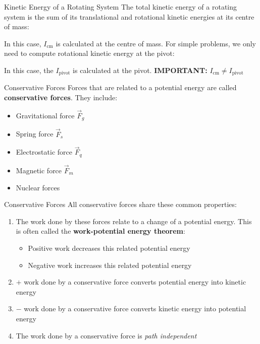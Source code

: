 \documentclass[12pt,compress,aspectratio=169]{beamer}
\begin{document}
\begin{frame}{Kinetic Energy of a Rotating System}
  The total kinetic energy of a rotating system is the sum of its translational
  and rotational kinetic energies at its centre of mass:

  
  In this case, $I_\text{cm}$ is calculated at the centre of mass. For simple
  problems, we only need to compute rotational kinetic energy at the pivot:
  
  
  In this case, the $I_\text{pivot}$ is calculated at the pivot.
  \textbf{IMPORTANT:} $I_\text{cm}\neq I_\text{pivot}$
\end{frame}



\begin{frame}{Conservative Forces}
  Forces that are related to a potential energy are called
  \textbf{conservative forces}. They include:
  \begin{itemize}
  \item Gravitational force $\vec F_g$
  \item Spring force $\vec F_s$
  \item Electrostatic force $\vec F_q$
  \item Magnetic force $\vec F_m$
  \item Nuclear forces
  \end{itemize}
\end{frame}




\begin{frame}{Conservative Forces}
  All conservative forces share these common properties:
  \begin{enumerate}
  \item The work done by these forces relate to a change of a potential energy.
    This is often called the \textbf{work-potential energy theorem}:

    \begin{itemize}
    \item\vspace{-.17in}Positive work decreases this related potential energy
    \item Negative work increases this related potential energy
    \end{itemize}
  \item $+$ work done by a conservative force converts potential energy
    into kinetic energy
  \item $-$ work done by a conservative force converts kinetic energy
    into potential energy
  \item The work done by a conservative force is \emph{path independent}
  \end{enumerate}
\end{frame}
\end{document}
